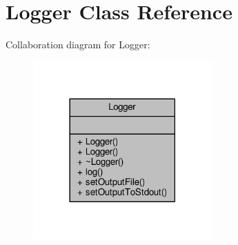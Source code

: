 \hypertarget{classLogger}{\section{Logger Class Reference}
\label{classLogger}
}


Collaboration diagram for Logger\-:
\nopagebreak
\begin{figure}[H]
\begin{center}
\leavevmode
\includegraphics[width=194pt]{classLogger__coll__graph}
\end{center}
\end{figure}
